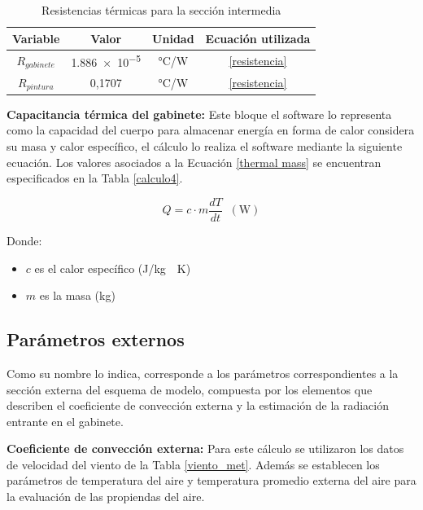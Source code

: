 \begin{table}[H]
\centering
\caption{Resistencias térmicas para la sección intermedia}
\label{calculo5}
\begin{tabular}{cccc}
\toprule
\textbf{Variable} & \textbf{Valor}                                        & \textbf{Unidad} & \textbf{Ecuación utilizada}        \\ \midrule
$R_{gabinete}$   & \num{1,886e-5} & \si{\celsius/\watt}  & \ref{resistencia} \\
$R_{pintura}$    & 0,1707  & \si{\celsius/\watt}  & \ref{resistencia} \\ \bottomrule
\end{tabular}
\end{table}

\textbf{Capacitancia térmica del gabinete:} Este bloque el software lo representa como la capacidad del cuerpo para almacenar energía en forma de calor considera su masa y calor específico, el cálculo lo realiza el software mediante la siguiente ecuación. Los valores asociados a la Ecuación \ref{thermal mass} se encuentran especificados en la Tabla \ref{calculo4}.

\begin{equation}\label{thermal mass}
    Q=c\cdot m\frac{dT}{dt}\;\;(\si{\watt})
\end{equation}

Donde:

\begin{itemize}
    \item $c$ es el calor específico (\si{\joule/\kilogram\cdot\kelvin})
    \item $m$ es la masa (\si{\kilogram})
\end{itemize}

\subsection{Parámetros externos}

Como su nombre lo indica, corresponde a los parámetros correspondientes a la sección externa del esquema de modelo, compuesta por los elementos que describen el coeficiente de convección externa y la estimación de la radiación entrante en el gabinete.

\textbf{Coeficiente de convección externa:} Para este cálculo se utilizaron los datos de velocidad del viento de la Tabla \ref{viento_met}. Además se establecen los parámetros de temperatura del aire y temperatura promedio externa del aire para la evaluación de las propiendas del aire.

